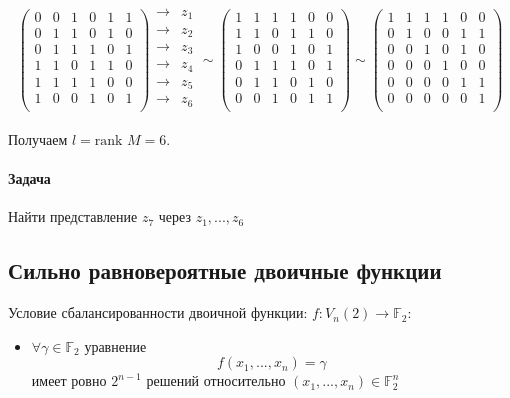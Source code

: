 \documentclass[a4paper,12pt]{article}
\newcommand{\rank}{\text{rank }}
\begin{document}
$$
\begin{pmatrix}
0 & 0 & 1 & 0 & 1 & 1 \\
0 & 1 & 1 & 0 & 1 & 0 \\
0 & 1 & 1 & 1 & 0 & 1 \\
1 & 1 & 0 & 1 & 1 & 0 \\
1 & 1 & 1 & 1 & 0 & 0 \\
1 & 0 & 0 & 1 & 0 & 1 \\
\end{pmatrix}
\begin{matrix}
\rightarrow & z_1 \\
\rightarrow & z_2 \\
\rightarrow & z_3 \\
\rightarrow & z_4 \\
\rightarrow & z_5 \\
\rightarrow & z_6 \\
\end{matrix} \sim
\begin{pmatrix}
1 & 1 & 1 & 1 & 0 & 0 \\
1 & 1 & 0 & 1 & 1 & 0 \\
1 & 0 & 0 & 1 & 0 & 1 \\
0 & 1 & 1 & 1 & 0 & 1 \\
0 & 1 & 1 & 0 & 1 & 0 \\
0 & 0 & 1 & 0 & 1 & 1 \\
\end{pmatrix} \sim
\begin{pmatrix}
1 & 1 & 1 & 1 & 0 & 0 \\
0 & 1 & 0 & 0 & 1 & 1 \\
0 & 0 & 1 & 0 & 1 & 0 \\
0 & 0 & 0 & 1 & 0 & 0 \\
0 & 0 & 0 & 0 & 1 & 1 \\
0 & 0 & 0 & 0 & 0 & 1 \\
\end{pmatrix}
$$

Получаем $l = \rank M = 6$.

\paragraph{Задача} Найти представление $z_7$ через $z_1, ..., z_6$

\subsection{Сильно равновероятные двоичные функции}
Условие сбалансированности двоичной функции: $f: V_n(2) \rightarrow \mathbb{F}_2$:
\begin{itemize}
\item $\forall \gamma \in \mathbb{F}_2$ уравнение \[ f(x_1, ..., x_n) = \gamma \] имеет ровно $2^{n-1}$ решений относительно $(x_1, ..., x_n) \in \mathbb{F}_2^n$
\end{itemize}
\end{document}
